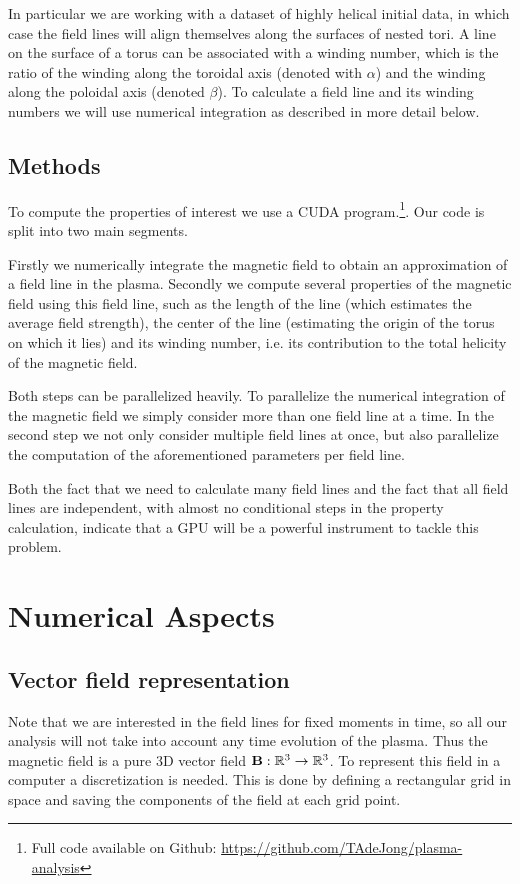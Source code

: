 \documentclass[a4paper]{article}
\renewcommand{\vec}{\bold}
\begin{document}
In particular we are working with a dataset of highly helical initial data, in which case the field lines will align themselves along the surfaces of nested tori. 
A line on the surface of a torus can be associated with a winding number, which is the ratio of the winding along the toroidal axis (denoted with $\alpha$) and the winding along the poloidal axis (denoted $\beta$). 
To calculate a field line and its winding numbers we will use numerical integration as described in more detail below.


\subsection{Methods}
To compute the properties of interest we use a CUDA program.\footnote{Full code available on Github: \url{https://github.com/TAdeJong/plasma-analysis}}.
Our code is split into two main segments. 

Firstly we numerically integrate the magnetic field to obtain an approximation of a field line in the plasma. 
Secondly we compute several properties of the magnetic field using this field line, such as the length of the line (which estimates the average field strength), the center of the line (estimating the origin of the torus on which it lies) and its winding number, i.e. its contribution to the total helicity of the magnetic field.

Both steps can be parallelized heavily. To parallelize the numerical integration of the magnetic field we simply consider more than one field line at a time. 
In the second step we not only consider multiple field lines at once, but also parallelize the computation of the aforementioned parameters per field line.

Both the fact that we need to calculate many field lines and the fact that all field lines are independent, with almost no conditional steps in the property calculation, indicate that a GPU will be a powerful instrument to tackle this problem.


\section{Numerical Aspects}
\subsection{Vector field representation}
Note that we are interested in the field lines for fixed moments in time, so all our analysis will not take into account any time evolution of the plasma. 
Thus the magnetic field is a pure 3D vector field $\vec{B}: \mathbb{R}^3 \to \mathbb{R}^3$. To represent this field in a computer a discretization is needed. 
This is done by defining a rectangular grid in space and saving the components of the field at each grid point. 
\end{document}
